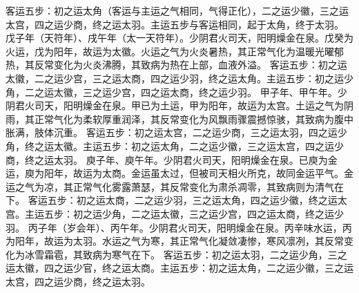 \documentclass[a4paper,12pt,UTF8,twoside]{ctexbook}
\begin{document}
客运五步：初之运太角（客运与主运之气相同，气得正化），二之运少徽，三之运太宫，四之运少商，终之运太羽。主运五步与客运相同，起于太角，终于太羽。
戊子年（天符年）、戌午年（太一天符年）。少阴君火司天，阳明燥金在泉。戊癸为火运，戊为阳年，故运为太徽。火运之气为火炎暑热，其正常气化为温暖光曜郁热，其反常变化为火炎沸腾，其致病为热在上部，血液外溢。
客运五步：初之运太徽，二之运少宫，三之运太商，四之运少羽，终之运太角。主运五步：初之运少角，二之运太徽，三之运少宫，四之运太商，终之运少羽。
甲子年、甲午年。少阴君火司天，阳明燥金在泉。甲已为土运，甲为阳年，故运为太宫。土运之气为阴雨，其正常气化为柔软厚重润泽，其反常变化为风飘雨骤震撼惊骇，其致病为腹中胀满，肢体沉重。
客运五步：初之运太宫，二之运少商，三之运太羽，四之运少角，终之运太徽。主运五步：初之运太角，二之运少徽，三之运太宫，四之运少商，终之运太羽。
庾子年、庾午年。少阴君火司天，阳明燥金在泉。已庾为金运，庾为阳年，故运为太商。金运虽太过，但被司天相火所克，故同金运平气。金运之气为凉，其正常气化雾露萧瑟，其反常变化为肃杀凋零，其致病则为清气在下。
客运五步：初之运太商，二之运少羽，三之运太角，四之运少徽，终之运太宫。主运五步：初之运少角，二之运太徽，三之运少宫，四之运太商，终之运少羽。
丙子年（岁会年）、丙午年。少阴君火司天，阳明燥金在泉。丙辛味水运，丙为阳年，故运为太羽。水运之气为寒，其正常气化凝敛凄惨，寒风凛冽，其反常变化为冰雪霜雹，其致病为寒气在下。
客运五步：初之运太羽，二之运少角，三之运太徽，四之运少官，终之运太商。主运五步：初之运太角，二之运少徽，三之运太宫，四之运少商，终之运太羽。
\end{document}
